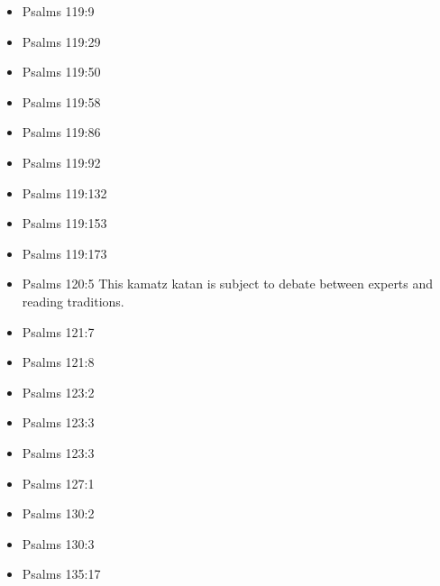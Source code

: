 \documentclass[14pt]{book}
\begin{document}
\begin{multicols}{2}
\begin{itemize}
							\item Psalms 119:9
							
							\item Psalms 119:29
							
							\item Psalms 119:50
							
							\item Psalms 119:58
							
							\item Psalms 119:86
							
							\item Psalms 119:92
							
							\item Psalms 119:132
							
							\item Psalms 119:153
							
							\item Psalms 119:173
							
							\item Psalms 120:5 This kamatz katan is subject to debate between experts and reading traditions.
							
							\item Psalms 121:7
							
							\item Psalms 121:8
							
							\item Psalms 123:2
							
							\item Psalms 123:3
							
							\item Psalms 123:3
							
							\item Psalms 127:1
							
							\item Psalms 130:2
							
							\item Psalms 130:3
							
							\item Psalms 135:17
							

\end{itemize}
\end{multicols}
\end{document}
